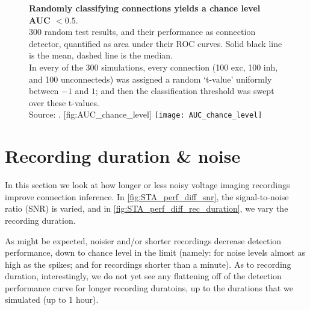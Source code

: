 \begin{figure}
    \begin{sidecaption}
        {\textbf{Randomly classifying connections yields a chance level AUC $< 0.5$}.\\
        300 random test results, and their performance as connection detector, quantified as area under their ROC curves. Solid black line is the mean, dashed line is the median.\\
        In every of the 300 simulations, every connection (100 exc, 100 inh, and 100 unconnecteds) was assigned a random `t-value' uniformly between $-1$ and $1$; and then the classification threshold was swept over these t-values.\\
        Source: .}
        [fig:AUC_chance_level]
        \texttt{[image: AUC\_chance\_level]}
    \end{sidecaption}
\end{figure}



\FloatBarrier
\section{Recording duration \& noise}

In this section we look at how longer or less noisy voltage imaging recordings improve connection inference. In \cref{fig:STA_perf_diff_snr}, the signal-to-noise ratio (SNR) is varied, and in \cref{fig:STA_perf_diff_rec_duration}, we vary the recording duration.

As might be expected, noisier and/or shorter recordings decrease detection performance, down to chance level in the limit (namely: for noise levels almost as high as the spikes; and for recordings shorter than a minute). As to recording duration, interestingly, we do not yet see any flattening off of the detection performance curve for longer recording duratoins, up to the durations that we simulated (up to 1 hour).

